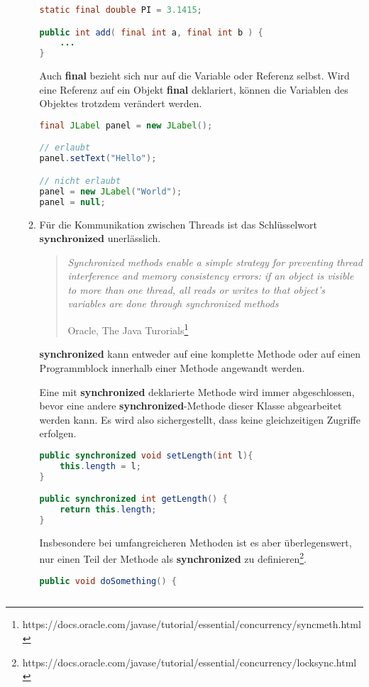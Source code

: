 \begin{enumerate}
\begin{enumerate}
\begin{lstlisting}[language=JAVA]
static final double PI = 3.1415;

public int add( final int a, final int b ) {
	...
}
\end{lstlisting}

Auch \textbf{final} bezieht sich nur auf die Variable oder Referenz selbst. Wird eine Referenz auf ein Objekt \textbf{final} deklariert, können die Variablen des Objektes trotzdem verändert werden.

\begin{lstlisting}[language=JAVA]
final JLabel panel = new JLabel();

// erlaubt
panel.setText("Hello");

// nicht erlaubt
panel = new JLabel("World");
panel = null;
\end{lstlisting}

\item Für die Kommunikation zwischen Threads ist das Schlüsselwort $\textbf{synchronized}$ unerlässlich. 
\begin{quote}%
\emph{Synchronized methods enable a simple strategy for preventing thread interference and memory consistency errors: if an object is visible to more than one thread, all reads or writes to that object's variables are done through synchronized methods}
\begin{flushright}Oracle, The Java Turorials\footnote{https://docs.oracle.com/javase/tutorial/essential/concurrency/syncmeth.html}\end{flushright}
\end{quote}
\textbf{synchronized} kann entweder auf eine komplette Methode oder auf einen Programmblock innerhalb einer Methode angewandt werden.

Eine mit \textbf{synchronized} deklarierte Methode wird immer abgeschlossen, bevor eine andere \textbf{synchronized}-Methode dieser Klasse abgearbeitet werden kann. Es wird also sichergestellt, dass keine gleichzeitigen Zugriffe erfolgen.
\begin{lstlisting}[language=JAVA]
public synchronized void setLength(int l){
	this.length = l;
}

public synchronized int getLength() {
	return this.length;
}
\end{lstlisting}

Insbesondere bei umfangreicheren Methoden ist es aber überlegenswert, nur einen Teil der Methode als \textbf{synchronized} zu definieren\footnote{https://docs.oracle.com/javase/tutorial/essential/concurrency/locksync.html}.
\begin{lstlisting}[language=JAVA]
public void doSomething() {
	

\end{lstlisting}
\end{enumerate}
\end{enumerate}
